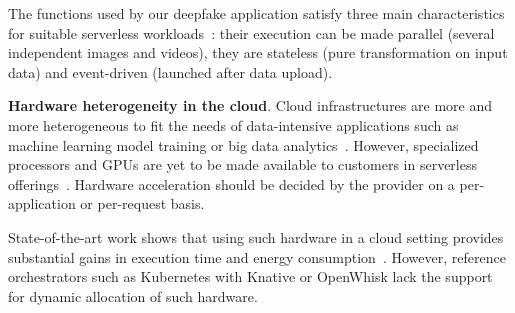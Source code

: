 The functions used by our deepfake application satisfy three main characteristics for suitable serverless workloads~\cite{cncf2018whitepaper}: their execution can be made parallel (several independent images and videos), they are stateless (pure transformation on input data) and event-driven (launched after data upload).





\textbf{Hardware heterogeneity in the cloud}. Cloud infrastructures are more and more heterogeneous to fit the needs of data-intensive applications such as machine learning model training or big data analytics~\cite{reissHeterogeneityDynamicityClouds}. However, specialized processors and GPUs are yet to be made available to customers in serverless offerings~\cite{khandelwalTaureauDeconstructingServerless2020}. Hardware acceleration should be decided by the provider on a per-application or per-request basis.

State-of-the-art work shows that using such hardware in a cloud setting provides substantial gains in execution time and energy consumption~\cite{10.1145/3369583.3392679, 9195730}. However, reference orchestrators such as Kubernetes with Knative or OpenWhisk lack the support for dynamic allocation of such hardware. %

